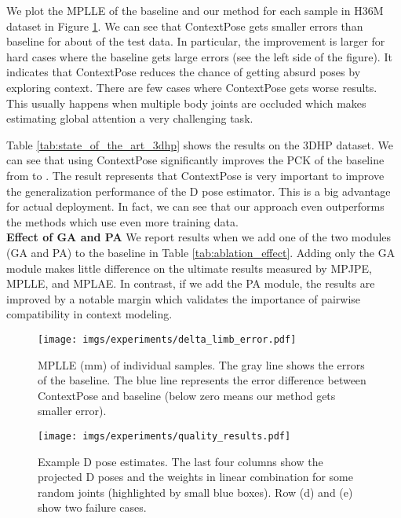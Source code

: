 We plot the MPLLE of the baseline and our method for each sample in H36M dataset in Figure \ref{fig:delta_error}. We can see that ContextPose gets smaller errors than baseline for about  of the test data. In particular, the improvement is larger for hard cases where the baseline gets large errors (see the left side of the figure). It indicates that ContextPose reduces the chance of getting absurd poses by exploring context. There are few cases where ContextPose gets worse results. This usually happens when multiple body joints are occluded which makes estimating global attention a very challenging task. 


Table \ref{tab:state_of_the_art_3dhp} shows the results on the 3DHP dataset. We can see that using ContextPose significantly improves the PCK of the baseline from  to . The result represents that ContextPose is very important to improve the generalization performance of the D pose estimator. This is a big advantage for actual deployment. In fact, we can see that our approach even outperforms the methods which use even more training data. \\



\noindent\textbf{Effect of GA and PA}
We report results when we add one of the two modules (GA and PA) to the baseline in Table \ref{tab:ablation_effect}. Adding only the GA module makes little difference on the ultimate results measured by MPJPE, MPLLE, and MPLAE. In contrast, if we add the PA module, the results are improved by a notable margin which validates the importance of pairwise compatibility in context modeling. \\


\begin{figure}
	\centering
	\texttt{[image: imgs/experiments/delta\_limb\_error.pdf]}
	\caption{MPLLE (mm) of individual samples. The gray line shows the errors of the baseline. The blue line represents the error difference between ContextPose and baseline (below zero means our method gets smaller error).}
	\label{fig:delta_error}
\end{figure}












\begin{figure}
	\centering
	\texttt{[image: imgs/experiments/quality\_results.pdf]}
	\caption{Example D pose estimates. The last four columns show the projected D poses and the weights in linear combination for some random joints (highlighted by small blue boxes). Row (d) and (e) show two failure cases.}
	\label{fig:quality_results}
\end{figure}



